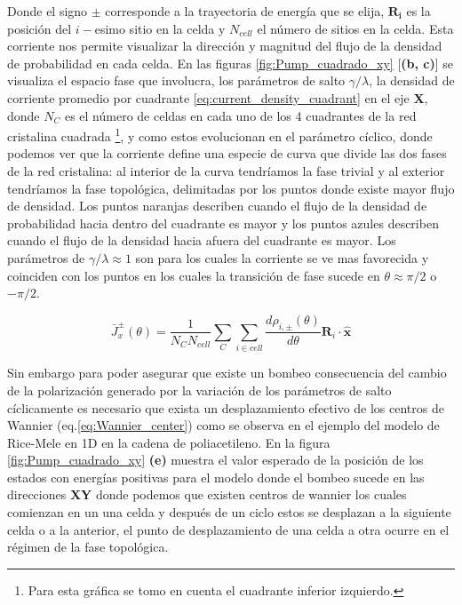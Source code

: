 Donde el signo $\pm$ corresponde a la trayectoria de energía que se elija, $\mathbf{R_i}$ es la posición del $i-$esimo sitio en la celda y $N_{cell}$ el número de sitios en la celda. Esta corriente nos permite visualizar la dirección y magnitud del flujo de la densidad de probabilidad en cada celda. En las figuras \ref{fig:Pump_cuadrado_xy} [\textbf{(b, c)}] se visualiza el espacio fase que involucra, los parámetros de salto $\gamma/\lambda$, la densidad de corriente promedio por cuadrante \ref{eq:current_density_cuadrant} en el eje \textbf{X}, donde $N_C$ es el número de celdas en cada uno de los 4 cuadrantes de la red cristalina cuadrada \footnote{Para esta gráfica se tomo en cuenta el cuadrante inferior izquierdo.}, y como estos evolucionan en el parámetro cíclico, donde podemos ver que la corriente define una especie de curva que divide las dos fases de la red cristalina: al interior de la curva tendríamos la fase trivial y al exterior tendríamos la fase topológica, delimitadas por los puntos donde existe mayor flujo de densidad. Los puntos naranjas describen cuando el flujo de la densidad de probabilidad hacia dentro del cuadrante es mayor y los puntos azules describen cuando el flujo de la densidad hacia afuera del cuadrante es mayor. Los parámetros de $\gamma/\lambda \approx 1$ son para los cuales la corriente se ve mas favorecida y coinciden con los puntos en los cuales la transición de fase sucede en $\theta \approx \pi/2 $ o $-\pi/2$.

\begin{equation}
    \label{eq:current_density_cuadrant}
    \bar{J}^{\pm}_x(\theta) =\frac{1}{N_C N_{cell}} \sum_{C} \sum_{i \in cell} \frac{d \rho_{i,\pm}(\theta)}{d\theta} \mathbf{R}_i \cdot \mathbf{\hat{x}}  
\end{equation}

Sin embargo para poder asegurar que existe un bombeo consecuencia del cambio de la polarización generado por la variación de los parámetros de salto cíclicamente es necesario que exista un desplazamiento efectivo de los centros de Wannier (eq.\ref{eq:Wannier_center}) como se observa en el ejemplo del modelo de Rice-Mele en 1D en la cadena de poliacetileno. En la figura \ref{fig:Pump_cuadrado_xy} \textbf{(e)} muestra el valor esperado de la posición de los estados con energías positivas para el modelo donde el bombeo sucede en las direcciones \textbf{XY} donde podemos que existen centros de wannier los cuales comienzan en un una celda y después de un ciclo estos se desplazan a la siguiente celda o a la anterior, el punto de desplazamiento de una celda a otra ocurre en el régimen de la fase topológica. 

